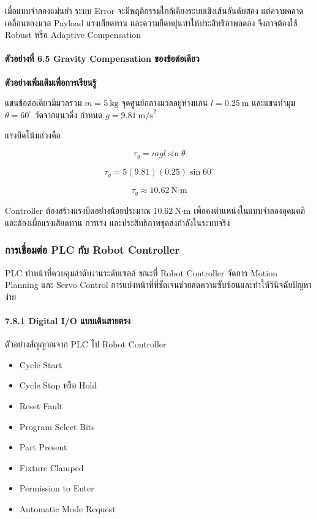 เมื่อแบบจำลองแม่นยำ ระบบ Error จะมีพฤติกรรมใกล้เคียงระบบเชิงเส้นอันดับสอง แต่ความคลาดเคลื่อนของมวล Payload แรงเสียดทาน และความยืดหยุ่นทำให้ประสิทธิภาพลดลง จึงอาจต้องใช้ Robust หรือ Adaptive Compensation

\paragraph{ตัวอย่างที่ 6.5 Gravity Compensation ของข้อต่อเดียว}

\textbf{ตัวอย่างเพิ่มเติมเพื่อการเรียนรู้}

แขนข้อต่อเดียวมีมวลรวม $m=5\ \text{kg}$ จุดศูนย์กลางมวลอยู่ห่างแกน $l=0.25\ \text{m}$ และแขนทำมุม $\theta=60^\circ$ วัดจากแนวดิ่ง กำหนด $g=9.81\ \text{m/s}^2$

แรงบิดโน้มถ่วงคือ

\[
\tau_g=mgl\sin\theta
\]

\[
\tau_g=5(9.81)(0.25)\sin60^\circ
\]

\[
\tau_g\approx10.62\ \text{N·m}
\]

Controller ต้องสร้างแรงบิดอย่างน้อยประมาณ $10.62\ \text{N·m}$ เพื่อคงตำแหน่งในแบบจำลองอุดมคติ และต้องเผื่อแรงเสียดทาน การเร่ง และประสิทธิภาพชุดส่งกำลังในระบบจริง



\subsubsection{การเชื่อมต่อ PLC กับ Robot Controller}

PLC ทำหน้าที่ควบคุมลำดับงานระดับเซลล์ ขณะที่ Robot Controller จัดการ Motion Planning และ Servo Control การแบ่งหน้าที่ที่ชัดเจนช่วยลดความซับซ้อนและทำให้วินิจฉัยปัญหาง่าย

\paragraph{7.8.1 Digital I/O แบบเดินสายตรง}

ตัวอย่างสัญญาณจาก PLC ไป Robot Controller

\begin{itemize}
    \item Cycle Start
    \item Cycle Stop หรือ Hold
    \item Reset Fault
    \item Program Select Bits
    \item Part Present
    \item Fixture Clamped
    \item Permission to Enter
    \item Automatic Mode Request
\end{itemize}

